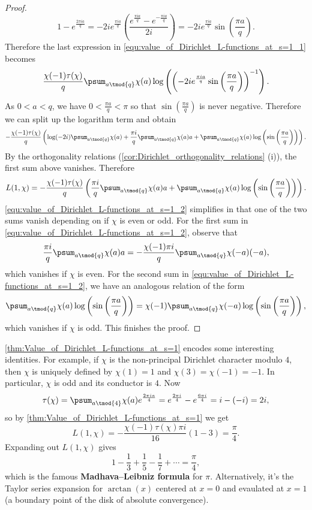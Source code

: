 \begin{proof}
        \[
          1-e^{\frac{2\pi ia}{q}} = -2ie^{\frac{\pi ia}{q}}\left(\frac{e^{\frac{\pi ia}{q}}-e^{-\frac{\pi ia}{q}}}{2i}\right) = -2ie^{\frac{\pi ia}{q}}\sin\left(\frac{\pi a}{q}\right).
        \]
        Therefore the last expression in \cref{equ:value_of_Dirichlet_L-functions_at_s=1_1} becomes
        \[
          \frac{\chi(-1)\tau(\chi)}{q}\psum_{a \tmod{q}}\chi(a)\log\left(\left(-2ie^{\frac{\pi ia}{q}}\sin\left(\frac{\pi a}{q}\right)\right)^{-1}\right).
        \]
        As $0< a < q$, we have $0 < \frac{\pi a}{q} < \pi$ so that $\sin\left(\frac{\pi a}{q}\right)$ is never negative. Therefore we can split up the logarithm term and obtain
        \[
          -\frac{\chi(-1)\tau(\chi)}{q}\left(\log(-2i)\psum_{a \tmod{q}}\chi(a)+\frac{\pi i}{q}\psum_{a \tmod{q}}\chi(a)a+\psum_{a \tmod{q}}\chi(a)\log\left(\sin\left(\frac{\pi a}{q}\right)\right)\right).
        \]
        By the orthogonality relations (\cref{cor:Dirichlet_orthogonality_relations} (i)), the first sum above vanishes. Therefore
        \begin{equation}\label{equ:value_of_Dirichlet_L-functions_at_s=1_2}
          L(1,\chi) = -\frac{\chi(-1)\tau(\chi)}{q}\left(\frac{\pi i}{q}\psum_{a \tmod{q}}\chi(a)a+\psum_{a \tmod{q}}\chi(a)\log\left(\sin\left(\frac{\pi a}{q}\right)\right)\right).
        \end{equation}
        \cref{equ:value_of_Dirichlet_L-functions_at_s=1_2} simplifies in that one of the two sums vanish depending on if $\chi$ is even or odd. For the first sum in \cref{equ:value_of_Dirichlet_L-functions_at_s=1_2}, observe that
        \[
          \frac{\pi i}{q}\psum_{a \tmod{q}}\chi(a)a = -\frac{\chi(-1)\pi i}{q}\psum_{a \tmod{q}}\chi(-a)(-a),
        \]
        which vanishes if $\chi$ is even. For the second sum in \cref{equ:value_of_Dirichlet_L-functions_at_s=1_2}, we have an analogous relation of the form
        \[
          \psum_{a \tmod{q}}\chi(a)\log\left(\sin\left(\frac{\pi a}{q}\right)\right) = \chi(-1)\psum_{a \tmod{q}}\chi(-a)\log\left(\sin\left(\frac{\pi a}{q}\right)\right),
        \]
        which vanishes if $\chi$ is odd. This finishes the proof.
      \end{proof}

      \cref{thm:Value_of_Dirichlet_L-functions_at_s=1} encodes some interesting identities. For example, if $\chi$ is the non-principal Dirichlet character modulo $4$, then $\chi$ is uniquely defined by $\chi(1) = 1$ and $\chi(3) = \chi(-1) = -1$. In particular, $\chi$ is odd and its conductor is $4$. Now
      \[
        \tau(\chi) = \psum_{a \tmod{4}}\chi(a)e^{\frac{2\pi ia}{4}} = e^{\frac{2\pi i}{4}}-e^{\frac{6\pi i}{4}} = i-(-i) = 2i,
      \]
      so by \cref{thm:Value_of_Dirichlet_L-functions_at_s=1} we get
      \[
        L(1,\chi) = -\frac{\chi(-1)\tau(\chi)\pi i}{16}(1-3) = \frac{\pi}{4}.
      \]
      Expanding out $L(1,\chi)$ gives
      \[
        1-\frac{1}{3}+\frac{1}{5}-\frac{1}{7}+\cdots = \frac{\pi}{4},
      \]
      which is the famous \textbf{Madhava–Leibniz formula} for $\pi$. Alternatively, it's the Taylor series expansion for $\arctan(x)$ centered at $x = 0$ and evaulated at $x = 1$ (a boundary point of the disk of absolute convergence).